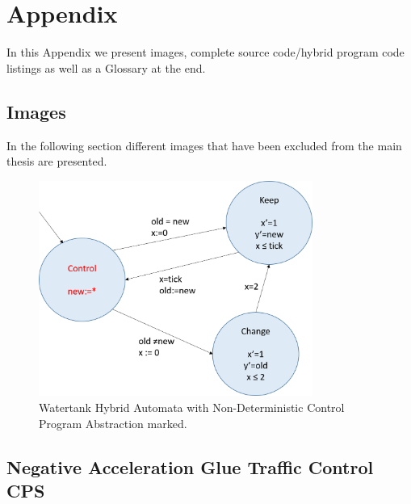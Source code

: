 


\chapter{Appendix}
\label{chap:appendix}
In this Appendix we present images, complete source code/hybrid program code listings as well as a Glossary at the end.

\section{Images}
\label{app:sec:images}

In the following section different images that have been excluded from the main thesis are presented.

	\begin{figure}[h!]
		\centering
		\includegraphics[height=0.5\textheight,width=0.8\textwidth]{Images/ha_control}
		\caption{Watertank Hybrid  Automata with Non-Deterministic Control Program Abstraction marked.}
		\label{fig:ex_control}
	\end{figure}

\section{Negative Acceleration Glue Traffic Control CPS}
\label{app:sec:neg}

